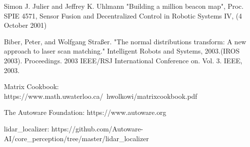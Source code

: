 \documentclass[12pt]{article}
\begin{document}
 
	
\begin{thebibliography}{99}

 Simon J. Julier and Jeffrey K. Uhlmann "Building a million beacon map", Proc. SPIE 4571, Sensor Fusion and Decentralized Control in Robotic Systems IV, (4 October 2001)

 Biber, Peter, and Wolfgang Straßer. "The normal distributions transform: A new approach to laser scan matching." Intelligent Robots and Systems, 2003.(IROS 2003). Proceedings. 2003 IEEE/RSJ International Conference on. Vol. 3. IEEE, 2003.

 Matrix Cookbook: https://www.math.uwaterloo.ca/~hwolkowi/matrixcookbook.pdf

 The Autoware Foundation: https://www.autoware.org

 lidar\_localizer: https://github.com/Autoware-AI/core\_perception/tree/master/lidar\_localizer


\end{thebibliography}
	
\end{document}

